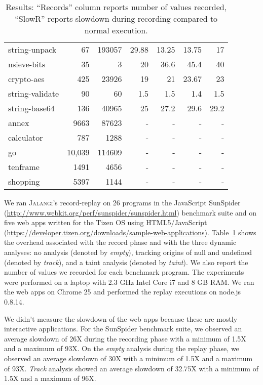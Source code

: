 \documentclass{sig-alternate}
\def\jalangi{\textsc{Jalangi}}
\begin{document}
\begin{table}
{\begin{center}
\begin{tabular}{|l|r|r|r|r|r|r|}
string-unpack& 67 & 193057 & 29.88 & 13.25 & 13.75 & 17\\
nsieve-bits& 35 & 3 & 20 & 36.6 & 45.4 & 40 \\
crypto-aes& 425 & 23926  & 19 & 21 & 23.67 & 23 \\
string-validate& 90 & 60 & 1.5 & 1.5 & 1.4 & 1.5\\
string-base64& 136 & 40965 & 25 & 27.2 & 29.6 & 29.2\\
\hline 
annex& 9663 & 87623 & - & - & - & - \\
calculator& 787 & 1288 & - & - & - & - \\
 go& 10,039 & 114609 & - & - & - & - \\
tenframe& 1491 &4656 & - & - & - & - \\
shopping& 5397 & 1144 & - & - & - & - \\
\hline 
\end{tabular}
\end{center}}
\caption{Results: ``Records'' column reports number of values
  recorded, ``SlowR'' reports
  slowdown during recording compared to normal execution.}
\label{tab:results}
\end{table}

We ran \jalangi{}'s record-replay on 26 programs in the JavaScript
SunSpider (\url{http://www.webkit.org/perf/sunspider/sunspider.html})
benchmark suite and on five web apps written for the Tizen OS using
HTML5/JavaScript
(\url{https://developer.tizen.org/downloads/sample-web-applications}).
Table~\ref{tab:results} shows the overhead associated with the record
phase and with the three dynamic analyses: no analysis (denoted by
\emph{empty}), tracking origins of null and undefined (denoted by
\emph{track}), and a taint analysis (denoted by \emph{taint}).  We
also report the number of values we recorded for each benchmark
program.  The experiments were performed on a laptop with 2.3 GHz
Intel Core i7 and 8 GB RAM.  We ran the web apps on Chrome 25 and
performed the replay executions on node.js 0.8.14.

We didn't measure the slowdown of the web apps because these are
mostly interactive applications.  For the SunSpider benchmark suite,
we observed an average slowdown of 26X during the recording phase with
a minimum of 1.5X and a maximum of 93X.  On the \emph{empty} analysis
during the replay phase, we observed an average slowdown of 30X with a
minimum of 1.5X and a maximum of 93X.  \emph{Track} analysis showed an
average slowdown of 32.75X with a minimum of 1.5X and a maximum of
96X.
\end{document}
